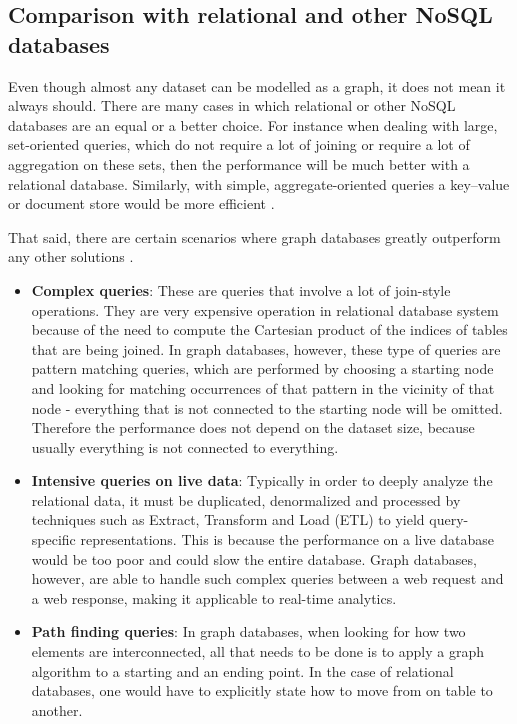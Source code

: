 \documentclass[12pt]{report}
\begin{document}
\subsection{Comparison with relational and other NoSQL databases}





Even though almost any dataset can be modelled as a graph, it does not mean it always should. There are many cases in which relational or other NoSQL databases are an equal or a better choice. For instance when dealing with large, set-oriented queries, which do not require a lot of joining or require a lot of aggregation on these sets, then the performance will be much better with a relational database. Similarly, with simple, aggregate-oriented queries a key--value or document store would be more efficient \cite{learning_neo4j}.

That said, there are certain scenarios where graph databases greatly outperform any other solutions \cite{learning_neo4j}. 
\begin{itemize}
\item {\bf Complex queries}: These are queries that involve a lot of join-style operations. They are very expensive operation in relational database system because of the need to compute the Cartesian product of the indices of tables that are being joined. In graph databases, however, these type of queries are pattern matching queries, which are performed by choosing a starting node and looking for matching occurrences of that pattern in the vicinity of that node - everything that is not connected to the starting node will be omitted. Therefore the performance does not depend on the dataset size, because usually everything is not connected to everything. 
\item {\bf Intensive queries on live data}: Typically in order to deeply analyze the relational data, it must be duplicated, denormalized and processed by techniques such as Extract, Transform and Load (ETL) to yield query-specific representations. This is because the performance on a live database would be too poor and could slow the entire database. Graph databases, however, are able to handle such complex queries between a web request and a web response, making it applicable to real-time analytics.
\item {\bf Path finding queries}: In graph databases, when looking for how two elements are interconnected, all that needs to be done is to apply a graph algorithm to a starting and an ending point. In the case of relational databases, one would have to explicitly state how to move from on table to another.
\end{itemize}
\end{document}
